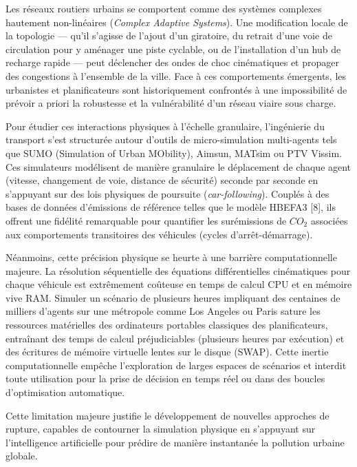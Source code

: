 \documentclass[10pt, a4paper]{article}
\begin{document}
Les réseaux routiers urbains se comportent comme des systèmes complexes
hautement non-linéaires (\emph{Complex Adaptive Systems}). Une
modification locale de la topologie --- qu'il s'agisse de l'ajout d'un
giratoire, du retrait d'une voie de circulation pour y aménager une
piste cyclable, ou de l'installation d'un hub de recharge rapide ---
peut déclencher des ondes de choc cinématiques et propager des
congestions à l'ensemble de la ville. Face à ces comportements
émergents, les urbanistes et planificateurs sont historiquement
confrontés à une impossibilité de prévoir a priori la robustesse et la
vulnérabilité d'un réseau viaire sous charge.

Pour étudier ces interactions physiques à l'échelle granulaire,
l'ingénierie du transport s'est structurée autour d'outils de
micro-simulation multi-agents tels que SUMO (Simulation of Urban
MObility), Aimsun, MATsim ou PTV Vissim. Ces simulateurs modélisent de
manière granulaire le déplacement de chaque agent (vitesse, changement
de voie, distance de sécurité) seconde par seconde en s'appuyant sur des
lois physiques de poursuite (\emph{car-following}). Couplés à des bases
de données d'émissions de référence telles que le modèle HBEFA3 {[}8{]},
ils offrent une fidélité remarquable pour quantifier les surémissions de
\(CO_2\) associées aux comportements transitoires des véhicules (cycles
d'arrêt-démarrage).

Néanmoins, cette précision physique se heurte à une barrière
computationnelle majeure. La résolution séquentielle des équations
différentielles cinématiques pour chaque véhicule est extrêmement
coûteuse en temps de calcul CPU et en mémoire vive RAM. Simuler un
scénario de plusieurs heures impliquant des centaines de milliers
d'agents sur une métropole comme Los Angeles ou Paris sature les
ressources matérielles des ordinateurs portables classiques des
planificateurs, entraînant des temps de calcul préjudiciables (plusieurs
heures par exécution) et des écritures de mémoire virtuelle lentes sur
le disque (SWAP). Cette inertie computationnelle empêche l'exploration
de larges espaces de scénarios et interdit toute utilisation pour la
prise de décision en temps réel ou dans des boucles d'optimisation
automatique.

Cette limitation majeure justifie le développement de nouvelles
approches de rupture, capables de contourner la simulation physique en
s'appuyant sur l'intelligence artificielle pour prédire de manière
instantanée la pollution urbaine globale.
\end{document}
